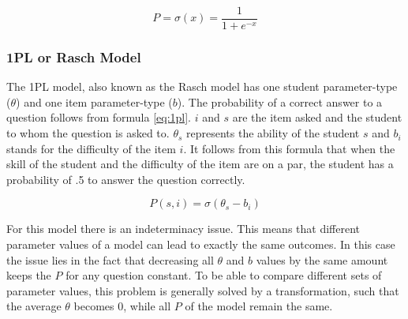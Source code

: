 \documentclass{scrartcl}
\begin{document}

 
\begin{equation}
\label{eq:logistic}
P = \sigma(x) = \frac{1}{1+e^{-x}}
\end{equation}

\subsubsection{1PL or Rasch Model}
\label{sec:1PL}
The 1PL model, also known as the Rasch model has one student parameter-type ($\theta$) and one item parameter-type ($b$). The probability of a correct answer to a question follows from formula \ref{eq:1pl}. $i$ and $s$ are the item asked and the student to whom the question is asked to. $\theta_{s}$ represents the ability of the student $s$ and $b_{i}$ stands for the difficulty of the item $i$. It follows from this formula that when the skill of the student and the difficulty of the item are on a par, the student has a probability of .5 to answer the question correctly. 

\begin{equation}
\label{eq:1pl}
P(s,i) = \sigma(\theta_{s} - b_{i})
\end{equation}

For this model there is an indeterminacy issue. This means that different parameter values of a model can lead to exactly the same outcomes. In this case the issue lies in the fact that decreasing all $\theta$ and $b$ values by the same amount keeps the $P$ for any question constant. To be able to compare different sets of parameter values, this problem is generally solved by a transformation, such that the average $\theta$ becomes 0, while all $P$ of the model remain the same.
\end{document}
